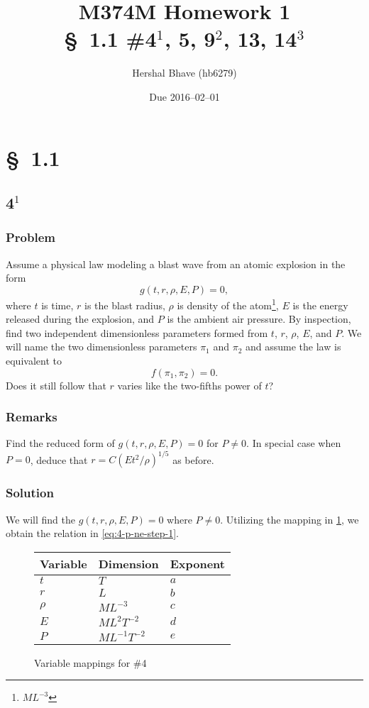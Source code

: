\documentclass[12pt]{article}
\title{M374M Homework 1 \\
  \normalsize{\S~1.1 \#4$^1$, 5, 9$^2$, 13, 14$^3$}}
\author{Hershal Bhave (hb6279)}
\date{Due 2016--02--01}
\begin{document}
\maketitle

\section{\S~1.1}
\subsection{4$^1$}
  \subsubsection*{Problem}
  Assume a physical law modeling a blast wave from an atomic explosion in the
  form
  \begin{equation}
    g(t,r,\rho,E,P)=0,
  \end{equation}
  where $t$ is time, $r$ is the blast radius, $\rho$ is density of the
  atom\footnote{$ML^{-3}$}, $E$ is the energy released during the explosion, and
  $P$ is the ambient air pressure. By inspection, find two independent
  dimensionless parameters formed from $t$, $r$, $\rho$, $E$, and $P$. We will
  name the two dimensionless parameters $\pi_1$ and $\pi_2$ and assume the law
  is equivalent to
  \begin{equation}
    f(\pi_1,\pi_2)=0.
  \end{equation}
  Does it still follow that $r$ varies like the two-fifths power of $t$?

  \subsubsection*{Remarks}
  Find the reduced form of $g(t,r,\rho,E,P)=0$ for $P\ne0$. In special case when
  $P=0$, deduce that $r=C{(Et^2/\rho)}^{1/5}$ as before.

  \subsubsection*{Solution}
  We will find the  $g(t,r,\rho,E,P)=0$ where $P\ne0$. Utilizing the
  mapping in \cref{fig:4-var-mappings}, we obtain the relation in
  \cref{eq:4-p-ne-step-1}.

  \begin{figure}
    \centering
    \begin{tabularx}{0.5\textwidth}{XXX}
      Variable & Dimension & Exponent \\ \midrule
      $t$ & $T$ & $a$ \\
      $r$ & $L$ & $b$ \\
      $\rho$ & $ML^{-3}$ & $c$ \\
      $E$ & $ML^{2}T^{-2}$ & $d$ \\
      $P$ & $ML^{-1}T^{-2}$ & $e$ \\
    \end{tabularx}
    \caption{Variable mappings for \#4}
\label{fig:4-var-mappings}
  \end{figure}
\end{document}
